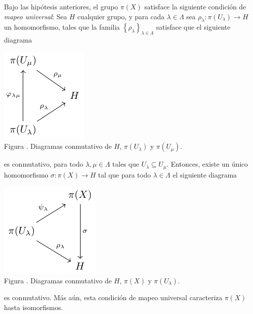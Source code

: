 \documentclass[12pt]{report}
\newcounter{it}
\theoremstyle{largebreak}
\newcommand\cf[3]{\ensuremath{#1:#2\rightarrow#3}}
\newcounter{figcount}
\begin{document}
    \begin{theor}
        Bajo las hipótesis anteriores, el grupo $\pi(X)$ satisface la siguiente condición de \textit{mapeo universal}: Sea $H$ cualquier grupo, y para cada $\lambda\in\Lambda$ sea $\cf{\rho_\lambda}{\pi(U_\lambda)}{H}$ un homomorfismo, tales que la familia $\left\{\rho_\lambda \right\}_{\lambda\in\Lambda}$ satisface que el siguiente diagrama

        \begin{minipage}{\textwidth}
            \begin{center}
                \includegraphics[scale=1.5]{images/fig_4.pdf}\\
                Figura \thefigcount. Diagramas conmutativo de $H$, $\pi(U_\lambda)$ y $\pi(U_\mu)$.
            \end{center}
        \end{minipage}

        es conmutativo, para todo $\lambda,\mu\in\Lambda$ tales que $U_\lambda\subseteq U_\mu$. Entonces, existe un único homomorfismo $\cf{\sigma}{\pi(X)}{H}$ tal que para todo $\lambda\in\Lambda$ el siguiente diagrama

        \begin{minipage}{\textwidth}
            \begin{center}
                \includegraphics[scale=1.5]{images/fig_5.pdf}\\
                Figura \thefigcount. Diagramas conmutativo de $H$, $\pi(X)$ y $\pi(U_\lambda)$.
            \end{center}
        \end{minipage}

        es conmutativo. Más aún, esta condición de mapeo universal caracteriza $\pi(X)$ hasta isomorfismos.
    \end{theor}
\end{document}
